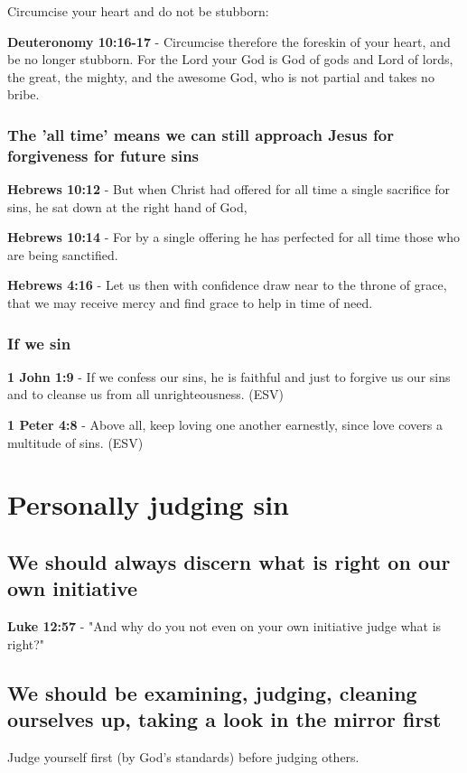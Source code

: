 \documentclass[11pt]{article}
\begin{document}
Circumcise your heart and do not be stubborn:

\textbf{Deuteronomy 10:16-17} - Circumcise therefore the foreskin of your heart, and be no longer stubborn. For the Lord your God is God of gods and Lord of lords, the great, the mighty, and the awesome God, who is not partial and takes no bribe.

\subsubsection{The 'all time' means we can still approach Jesus for forgiveness for future sins}
\label{sec:org47cc423}
\textbf{Hebrews 10:12} - But when Christ had offered for all time a single sacrifice for sins, he sat down at the right hand of God,

\textbf{Hebrews 10:14} - For by a single offering he has perfected for all time those who are being sanctified.

\textbf{Hebrews 4:16} - Let us then with confidence draw near to the throne of grace, that we may receive mercy and find grace to help in time of need.

\subsubsection{If we sin}
\label{sec:org25b815b}
\textbf{1 John 1:9} -  If we confess our sins, he is faithful and just to forgive us our sins and to cleanse us from all unrighteousness.  (ESV)

\textbf{1 Peter 4:8} -  Above all, keep loving one another earnestly, since love covers a multitude of sins.  (ESV)

\section{Personally judging sin}
\label{sec:orgbb3de45}
\subsection{We should always discern what is right on our own initiative}
\label{sec:org7a82d28}
\textbf{Luke 12:57} - "And why do you not even on your own initiative judge what is right?"

\subsection{We should be examining, judging, cleaning ourselves up, taking a look in the mirror first}
\label{sec:orgb699bea}
Judge yourself first (by God's standards) before judging others.
\end{document}
